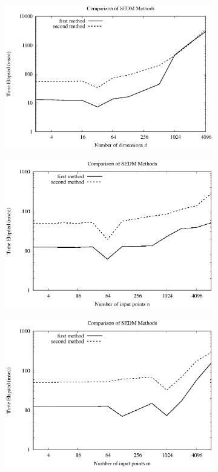 \documentclass[10pt, a4paper]{article}
\begin{document}
\begin{figure}[h]
	\centering
	\begin{subfigure}{.33\textwidth}
		\centering
		\includegraphics[width=\linewidth]{sedm_d}
	\end{subfigure}%
	\begin{subfigure}{.33\textwidth}
		\centering
		\includegraphics[width=\linewidth]{sedm_n}
	\end{subfigure}%
	\begin{subfigure}{.33\textwidth}
		\centering
		\includegraphics[width=\linewidth]{sedm_m}

\end{subfigure}
\end{figure}
\end{document}
